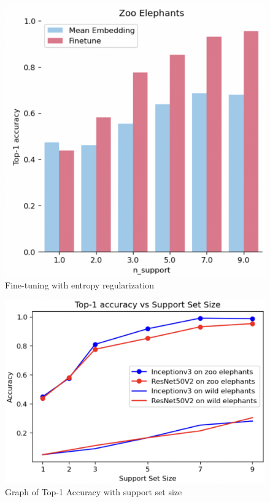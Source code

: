 \documentclass[10pt,twocolumn,letterpaper]{article}
\begin{document}
\begin{figure}[t]
  \centering
  \includegraphics[scale=0.35]{finetune_graph}
   \caption{Fine-tuning with entropy regularization}
   \label{fig:finetune_graph}
\end{figure}

\begin{figure}[t]
 \centering
 \includegraphics[scale=0.35]{few_shot_graph}
  \caption{Graph of Top-1 Accuracy with support set size}
  \label{fig:few_shot_graph}
\end{figure}
\end{document}
